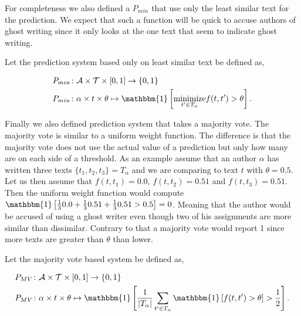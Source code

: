 For completeness we also defined a $P_{min}$ that use only the least similar
text for the prediction. We expect that such a function will be quick to accuse
authors of ghost writing since it only looks at the one text that seem to
indicate ghost writing.

\begin{definition}
    \label{def:minimum_prediction_system}

    Let the prediction system based only on least similar text be defined as,

    \begin{align}
        &P_{min} \colon \mathcal{A} \times \mathcal{T} \times [0, 1] \rightarrow
            \{0, 1\} \\
        &P_{min} \colon \alpha \times t \times \theta \mapsto \mathbbm{1}\left[
                \underset{t' \in T_\alpha}{\text{minimize}} f(t, t') > \theta
            \right].
    \end{align}

\end{definition}

Finally we also defined prediction system that takes a majority vote. The
majority vote is similar to a uniform weight function. The difference is that
the majority vote does not use the actual value of a prediction but only how
many are on each side of a threshold. As an example assume that an author
$\alpha$ has written three texts $\{t_1, t_2, t_3\} = T_\alpha$ and we are
comparing to text $t$ with $\theta = 0.5$. Let us then assume that $f(t, t_1) =
0.0$, $f(t, t_2) = 0.51$ and $f(t, t_3) = 0.51$. Then the uniform weight
function would compute $\mathbbm{1} \left[ \frac{1}{3} 0.0 + \frac{1}{3} 0.51 +
\frac{1}{3} 0.51 > 0.5 \right] = 0$. Meaning that the author would be accused of
using a ghost writer even though two of his assignments are more similar than
dissimilar. Contrary to that a majority vote would report 1 since more
texts are greater than $\theta$ than lower.

\begin{definition}
    \label{def:majority_vote_prediction_system}

    Let the majority vote based system be defined as,

    \begin{align}
        &P_{MV} \colon \mathcal{A} \times \mathcal{T} \times [0, 1] \rightarrow
            \{0, 1\} \\
        &P_{MV} \colon \alpha \times t \times \theta \mapsto \mathbbm{1}\left[
                \frac{1}{|T_\alpha|} \sum_{t' \in T_\alpha} \mathbbm{1}\left[
                    f(t, t') > \theta
                \right] > \frac{1}{2}
            \right].
    \end{align}

\end{definition}

